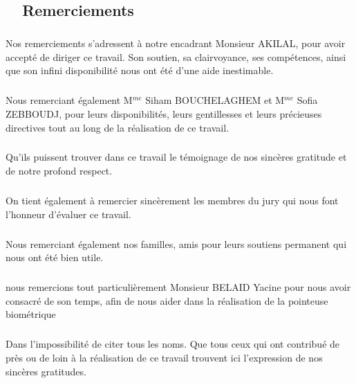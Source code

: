 \begin{titlepage}
\newpage
\pagestyle{fancy}      
\lhead{}  
\chead{}     
\rhead{}     
    
\renewcommand{\headrulewidth}{0.5pt}

\chapter*{\hrulefill ~~\textbf{Remerciements}~ \hrulefill}
\paragraph{}
\paragraph{}
\large

Nos remerciements s'adressent à notre encadrant Monsieur AKILAL, pour avoir accepté de diriger ce travail. Son soutien, sa clairvoyance, ses compétences, ainsi que son infini disponibilité nous ont été d'une aide inestimable.
\paragraph{}
Nous remerciant également M$^{me}$ Siham BOUCHELAGHEM et M$^{me}$ Sofia ZEBBOUDJ, pour leurs disponibilités, leurs gentillesses et leurs précieuses directives tout au long de la réalisation de ce travail.
\paragraph{}
Qu'ils puissent trouver dans ce travail le témoignage de nos sincères gratitude et de notre profond respect.
\paragraph{}
On tient également à remercier sincèrement les membres du jury qui nous font l’honneur d'évaluer ce travail.
\paragraph{}
Nous remerciant également nos familles, amis pour leurs soutiens permanent qui nous ont été bien utile.
\paragraph{}
nous remercions tout particulièrement Monsieur BELAID Yacine pour nous avoir consacré de son temps, afin de nous aider dans la réalisation de la pointeuse biométrique
\paragraph{}
Dans l’impossibilité de citer tous les noms. Que tous ceux qui ont contribué de près ou de loin à la réalisation de ce travail trouvent ici l’expression de nos sincères gratitudes.


\thispagestyle{empty}		

\end{titlepage}	